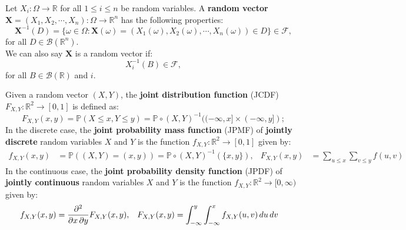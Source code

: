 \documentclass{huhtakm-template-book-v2}
\newcommand{\prob}{\mathbb{P}}
\begin{document}
    \begin{sdefn}
        Let $X_{i} : \Omega \to \mathbb{R}$ for all $1 \leq i \leq n$ be random variables. A \textbf{random vector} $\mathbf{X} = (X_{1}, X_{2}, \cdots, X_{n}) : \Omega \to \mathbb{R}^{n}$ has the following properties:
        \begin{equation*}
            \mathbf{X}^{-1}(D) = \{\omega \in \Omega : \mathbf{X}(\omega) = (X_{1}(\omega), X_{2}(\omega), \cdots, X_{n}(\omega)) \in D\} \in \mathcal{F},
        \end{equation*}
        for all $D \in \mathcal{B}(\mathbb{R}^{n})$.\\
        We can also say $\mathbf{X}$ is a random vector if:
        \begin{equation*}
            X_{i}^{-1}(B) \in \mathcal{F},
        \end{equation*}
        for all $B \in \mathcal{B}(\mathbb{R})$ and $i$.
    \end{sdefn}
    \begin{sdefn}
        Given a random vector $(X, Y)$, the \textbf{joint distribution function} (JCDF) $F_{X,Y} : \mathbb{R}^{2} \to [0,1]$ is defined as:
        \begin{equation*}
            F_{X,Y}(x, y) = \prob(X \leq x, Y \leq y) = \prob \circ (X, Y)^{-1}((-\infty, x] \times (-\infty, y]);
        \end{equation*}
        In the discrete case, the \textbf{joint probability mass function} (JPMF) of \textbf{jointly discrete} random variables $X$ and $Y$ is the function $f_{X,Y} : \mathbb{R}^{2} \to [0,1]$ given by:
        \begin{align*}
            f_{X,Y}(x, y) &= \prob((X, Y) = (x, y)) = \prob \circ (X, Y)^{-1}(\{x, y\}), & F_{X,Y}(x, y) &= \sum_{u \leq x}\sum_{v \leq y}f(u, v)
        \end{align*}
        In the continuous case, the \textbf{joint probability density function} (JPDF) of \textbf{jointly continuous} random variables $X$ and $Y$ is the function $f_{X,Y} : \mathbb{R}^{2} \to [0, \infty)$ given by:
        \begin{align*}
            f_{X,Y}(x, y) &= \pdv*{F_{X,Y}(x, y)}{x, y}, & F_{X,Y}(x, y) &= \int_{-\infty}^{y}\int_{-\infty}^{x}f_{X,Y}(u, v)\,du\,dv
        \end{align*}
    \end{sdefn}
\end{document}

